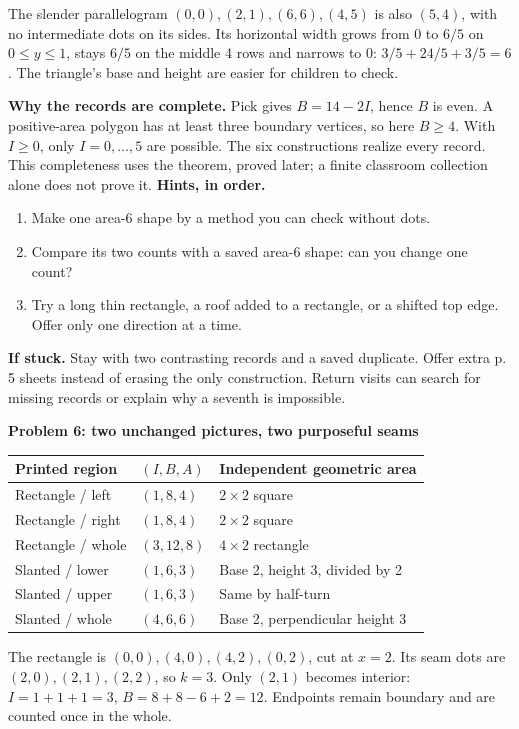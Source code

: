 \documentclass[letterpaper,11pt]{article}
\newcommand{\heading}[1]{\vspace{3pt}{\large\bfseries #1}\par}
\newcommand{\subhead}[1]{\vspace{2pt}\textbf{#1}\par}
\newcommand{\hints}[3]{\textbf{Hints, in order.}\begin{enumerate}\item #1\item #2\item #3\end{enumerate}}
\begin{document}
The slender parallelogram $(0,0),\allowbreak(2,1),\allowbreak(6,6),\allowbreak(4,5)$ is also $(5,4)$, with no intermediate dots on its sides. Its horizontal width grows from 0 to $6/5$ on $0\leq y\leq1$, stays $6/5$ on the middle 4 rows and narrows to 0: $3/5+24/5+3/5=6$. The triangle's base and height are easier for children to check.

\textbf{Why the records are complete.} Pick gives $B=14-2I$, hence $B$ is even. A positive-area polygon has at least three boundary vertices, so here $B\geq4$. With $I\geq0$, only $I=0,\ldots,5$ are possible. The six constructions realize every record. This completeness uses the theorem, proved later; a finite classroom collection alone does not prove it.
\hints{Make one area-6 shape by a method you can check without dots.}{Compare its two counts with a saved area-6 shape: can you change one count?}{Try a long thin rectangle, a roof added to a rectangle, or a shifted top edge. Offer only one direction at a time.}
\textbf{If stuck.} Stay with two contrasting records and a saved duplicate. Offer extra p.\,5 sheets instead of erasing the only construction. Return visits can search for missing records or explain why a seventh is impossible.
\newpage

\heading{Problems 6--7 / student pp.\,6--7 / what a seam changes}
\subhead{Problem 6: two unchanged pictures, two purposeful seams}

\begin{tabularx}{\linewidth}{@{}L{1.48in}L{1.23in}X@{}}\toprule
Printed region & $(I,B,A)$ & Independent geometric area\\\midrule
Rectangle / left & $(1,8,4)$ & $2\times2$ square\\
Rectangle / right & $(1,8,4)$ & $2\times2$ square\\
Rectangle / whole & $(3,12,8)$ & $4\times2$ rectangle\\
Slanted / lower & $(1,6,3)$ & Base 2, height 3, divided by 2\\
Slanted / upper & $(1,6,3)$ & Same by half-turn\\
Slanted / whole & $(4,6,6)$ & Base 2, perpendicular height 3\\\bottomrule
\end{tabularx}

The rectangle is $(0,0),\allowbreak(4,0),\allowbreak(4,2),\allowbreak(0,2)$, cut at $x=2$. Its seam dots are $(2,0),\allowbreak(2,1),\allowbreak(2,2)$, so $k=3$. Only $(2,1)$ becomes interior: $I=1+1+1=3$, $B=8+8-6+2=12$. Endpoints remain boundary and are counted once in the whole.
\end{document}
